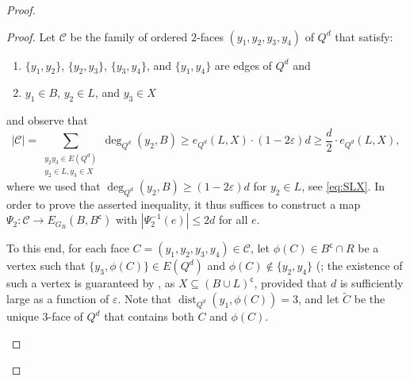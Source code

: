 \documentclass[11pt,a4paper,oneside,reqno]{amsart}
\newcommand{\cC}{\mathcal{C}}
\DeclareMathOperator{\dist}{dist}
\newcommand{\eps}{\varepsilon}
\begin{document}
\begin{proof}
  \begin{proof}
    Let $\cC$ be the family of ordered $2$-faces $(y_1,y_2,y_3,y_4)$ of $Q^d$ that satisfy:
    \begin{enumerate}[label=(\alph*)]
    \item 
      $\{y_1,y_2\}$, $\{y_2,y_3\}$, $\{y_3,y_4\}$, and $\{y_1,y_4\}$ are edges of $Q^d$ and
    \item 
      $y_1\in B$, $y_2\in L$, and $y_3 \in X$
    \end{enumerate}
    and observe that
    \begin{equation}
      \label{eq:cC-lower}
      |\cC| = \sum_{\substack{y_2y_3 \in E(Q^d) \\ y_2 \in L, y_3 \in X}} \deg_{Q^d}(y_2, B) \ge e_{Q^d}(L, X) \cdot (1-2\eps)d \ge \frac{d}{2} \cdot e_{Q^d}(L, X),
    \end{equation}
    where we used that $\deg_{Q^d}(y_2,B)\geq (1-2\eps)d$ for $y_2\in L$, see \eqref{eq:SLX}.
    In order to prove the asserted inequality, it thus suffices to construct a map $\Psi_2 \colon \cC \rightarrow E_{G_R}(B,B^{\mathsf{c}})$ with $|\Psi_2^{-1}(e)| \le 2d$ for all $e$.

    To this end, for each face $C = (y_1,y_2,y_3,y_4) \in \cC$, let $\phi(C) \in B^{\mathsf{c}}\cap R$ be a vertex such that $\{y_3,\phi(C)\} \in E(Q^d)$ and $\phi(C)\notin \{y_2,y_4\}$ (;
    the existence of such a vertex is guaranteed by , as $X \subseteq (B \cup L)^{\mathsf{c}}$, provided that $d$ is sufficiently large as a function of $\eps$.
    Note that $\dist_{Q^d}(y_1, \phi(C))=3$, and let $\tilde{C}$ be the unique $3$-face of $Q^d$ that contains both $C$ and $\phi(C)$.

    \begin{figure}[h]
      \centering
      {\hfil {}}
\end{figure}
\end{proof}
\end{proof}
\end{document}
